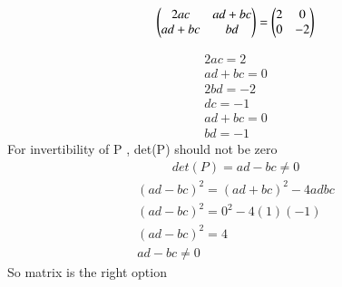 \documentclass[journal,12pt,twocolumn]{IEEEtran}
\begin{document}
\begin{align}
    \begin{pmatrix}2ac & ad+bc \\ad+bc & bd\end{pmatrix}=\begin{pmatrix}2 & 0 \\0 & -2 \end{pmatrix}
\end{align}


\begin{align}
    2ac=2\\
    ad+bc=0\\
    2bd=-2\\
    dc=-1\\
    ad+bc=0\\
    bd=-1   
\end{align}
For invertibility of P , det(P) should not be zero
\begin{align}
det(P)=ad-bc\neq0    
\end{align}
\begin{align}
    (ad-bc)^2=(ad+bc)^2-4adbc\\
    (ad-bc)^2=0^2-4(1)(-1)\\
    (ad-bc)^2=4\\
    ad-bc\neq0
\end{align}
So  matrix  is the right option
\end{document}
